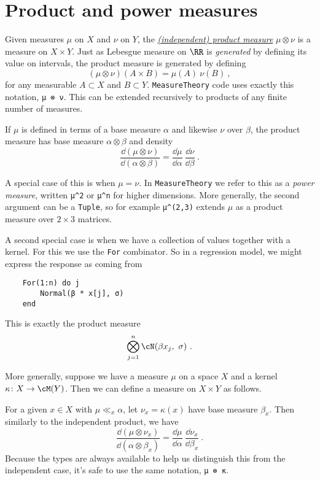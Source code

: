 \documentclass{juliacon}
\begin{document}
\section{Product and power measures}

Given measures $\mu$ on $X$ and $\nu$ on $Y$, the \href{https://en.wikipedia.org/wiki/Product_measure}{\emph{(independent) product measure}} $\mu \otimes \nu$ is a measure on $X\times Y$. Just as Lebesgue measure on $\RR$ is \emph{generated} by defining its value on intervals, the product measure is generated by defining
\[
(\mu \otimes \nu)(A\times B) = \mu(A)\ \nu(B)\ ,
\]
for any measurable $A\subset X$ and $B\subset Y$. \verb|MeasureTheory| code uses exactly this notation, \verb|μ ⊗ ν|. This can be extended recursively to products of any finite number of measures.

If $\mu$ is defined in terms of a base measure $\alpha$ and likewise $\nu$ over $\beta$, the product measure has base measure $\alpha \otimes \beta$ and density
\[
\frac{\dd(\mu \otimes \nu)}{\dd(\alpha \otimes \beta)} = \frac{\dd\mu}{\dd\alpha}\ \frac{\dd\nu}{\dd\beta}\ .
\]



A special case of this is when $\mu = \nu$. In \verb|MeasureTheory| we refer to this as a \emph{power measure}, written \verb|μ^2| or \verb|μ^n| for higher dimensions. More generally, the second argument can be a \verb|Tuple|, so for example \verb|μ^(2,3)| extends $\mu$ as a product measure over $2\times 3$ matrices.

A second special case is when we have a collection of values together with a kernel. For this we use the \verb|For| combinator. So in a regression model, we might express the response as coming from
\begin{verbatim}
    For(1:n) do j  
        Normal(β * x[j], σ)
    end
\end{verbatim}
This is exactly the product measure
\[
\bigotimes_{j=1}^n \cN(\beta x_j,\ \sigma)\ .
\]

More generally, suppose we have a measure $\mu$ on a space $X$ and a kernel $\kappa\colon X \to \cM(Y)$. Then we can define a measure on $X \times Y$ as follows.

For a given $x \in X$ with $\mu \ll_x \alpha$, let $\nu_x = \kappa(x)$ have base measure $\beta_x$. Then similarly to the independent product, we have
\[
\frac{\dd(\mu \otimes \nu_x)}{\dd(\alpha \otimes \beta_x)} = \frac{\dd\mu}{\dd\alpha}\ \frac{\dd\nu_x}{\dd\beta_x}\ .
\]
Because the types are always available to help us distinguish this from the independent case, it's safe to use the same notation, \verb|μ ⊗ κ|.
\end{document}
